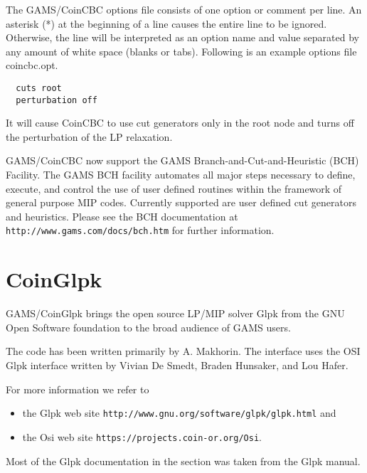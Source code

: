 The GAMS/CoinCBC options file consists of one option or comment per line.
An asterisk (*) at the beginning of a line causes the entire line to be ignored.
Otherwise, the line will be interpreted as an option name and value separated by any amount of white space (blanks or tabs).
Following is an example options file coincbc.opt.
\begin{verbatim}
  cuts root
  perturbation off
\end{verbatim}
It will cause CoinCBC to use cut generators only in the root node and turns off the perturbation of the LP relaxation.

GAMS/CoinCBC now support the GAMS Branch-and-Cut-and-Heuristic (BCH) Facility.
The GAMS BCH facility automates all major steps necessary to define, execute, and control the use of user defined routines within the framework of general purpose MIP codes.
Currently supported are user defined cut generators and heuristics.
Please see the BCH documentation at \texttt{http://www.gams.com/docs/bch.htm} for further information.







\section{CoinGlpk}

GAMS/CoinGlpk brings the open source LP/MIP solver Glpk from the GNU Open Software foundation to the broad audience of GAMS users.

The code has been written primarily by A. Makhorin.
The interface uses the OSI Glpk interface written by Vivian De Smedt, Braden Hunsaker, and Lou Hafer.

For more information we refer to
\begin{itemize}
\item the Glpk web site \texttt{http://www.gnu.org/software/glpk/glpk.html} and
\item the Osi web site \texttt{https://projects.coin-or.org/Osi}.
\end{itemize}
Most of the Glpk documentation in the section was taken from the Glpk manual.

